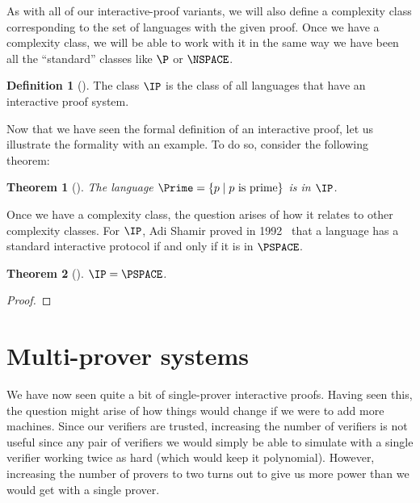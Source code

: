 \documentclass[english]{reedthesis}
\theoremstyle{plain}
\newtheorem{thm}{Theorem}[section]
\theoremstyle{definition}
\newtheorem{defn}[defn]{Definition}
\theoremstyle{remark}
\begin{document}
As with all of our interactive-proof variants, we will also define a complexity
class corresponding to the set of languages with the given proof. Once we have a
complexity class, we will be able to work with it in the same way we have been
all the ``standard'' classes like $\P$ or $\NSPACE$.

\begin{defn}[{\cite[Def.\ 4.2.5]{Go01}}]\label{def:ip}
  The class $\IP$ is the class of all languages that have an interactive proof
  system.
\end{defn}

Now that we have seen the formal definition of an interactive proof, let us
illustrate the formality with an example. To do so, consider the following
theorem:

\begin{thm}[{\cite{Pra75}}]\label{thm:primes-in-ip}
  The language $\Prime = \{p \mid p \text{ is prime}\}$ is in $\IP$.
\end{thm}

\begin{algorithm}[htbp]
  \caption{An interactive proof for the language $\Prime$}\label{alg:prime-ip}
\end{algorithm}

Once we have a complexity class, the question arises of how it relates to other
complexity classes. For $\IP$, Adi Shamir proved in 1992~\cite{Sha92} that a
language has a standard interactive protocol if and only if it is in $\PSPACE$.

\begin{thm}[{\cite{Sha92}}]\label{thm:ip-is-pspace}
  $\IP = \PSPACE$.
\end{thm}

\begin{proof}
\end{proof}

\section{Multi-prover systems}\label{sec:multi-prover}

We have now seen quite a bit of single-prover interactive proofs. Having seen
this, the question might arise of how things would change if we were to add more
machines. Since our verifiers are trusted, increasing the number of verifiers is
not useful since any pair of verifiers we would simply be able to simulate with
a single verifier working twice as hard (which would keep it polynomial).
However, increasing the number of provers to two turns out to give us more power
than we would get with a single prover.
\end{document}

